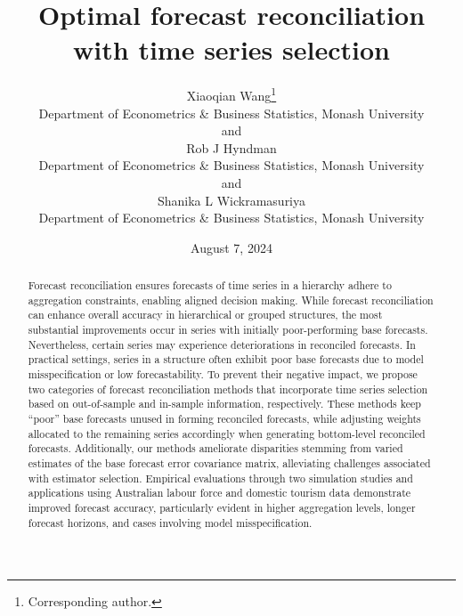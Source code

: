 \documentclass[
  11pt]{article}
\theoremstyle{plain}
\theoremstyle{remark}
\begin{document}
\def\spacingset#1{\renewcommand{\baselinestretch}%
{#1}\small\normalsize} \spacingset{1}

\renewcommand*{\arraystretch}{0.5} %


\date{August 7, 2024}
\title{\bf Optimal forecast reconciliation with time series selection}
\author{
Xiaoqian Wang\thanks{Corresponding author.} \vspace{0.2em}\\
Department of Econometrics \& Business Statistics, Monash
University \vspace{0.2em}\\
and \vspace{0.2em}\\Rob J Hyndman \vspace{0.2em}\\
Department of Econometrics \& Business Statistics, Monash
University \vspace{0.2em}\\
and \vspace{0.2em}\\Shanika L Wickramasuriya \vspace{0.2em}\\
Department of Econometrics \& Business Statistics, Monash
University \vspace{0.2em}\\
}
\maketitle

\bigskip
\bigskip
\begin{abstract}
Forecast reconciliation ensures forecasts of time series in a hierarchy
adhere to aggregation constraints, enabling aligned decision making.
While forecast reconciliation can enhance overall accuracy in
hierarchical or grouped structures, the most substantial improvements
occur in series with initially poor-performing base forecasts.
Nevertheless, certain series may experience deteriorations in reconciled
forecasts. In practical settings, series in a structure often exhibit
poor base forecasts due to model misspecification or low
forecastability. To prevent their negative impact, we propose two
categories of forecast reconciliation methods that incorporate time
series selection based on out-of-sample and in-sample information,
respectively. These methods keep ``poor'' base forecasts unused in
forming reconciled forecasts, while adjusting weights allocated to the
remaining series accordingly when generating bottom-level reconciled
forecasts. Additionally, our methods ameliorate disparities stemming
from varied estimates of the base forecast error covariance matrix,
alleviating challenges associated with estimator selection. Empirical
evaluations through two simulation studies and applications using
Australian labour force and domestic tourism data demonstrate improved
forecast accuracy, particularly evident in higher aggregation levels,
longer forecast horizons, and cases involving model misspecification.
\end{abstract}
\end{document}
